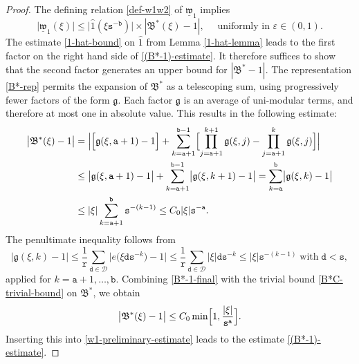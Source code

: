 \documentclass[12pt, twoside]{article}
\theoremstyle{definition}
\numberwithin{equation}{section}
\begin{document}
\begin{proof} 
The defining relation \eqref{def-w1w2} of $\underline{\mathfrak w}_1$ implies 
\begin{equation} \label{w1-preliminary-estimate}
\bigl| \underline{\mathfrak w}_1(\xi)\bigr| \leq  \bigl| \widehat{1}(\xi \mathtt s^{-\mathtt b}) \bigr| \times |\mathfrak B^{\ast}(\xi) - 1|, \quad \text{ uniformly in } \varepsilon\in(0,1). 
\end{equation} 
The estimate \eqref{1-hat-bound} on $\widehat{1}$ from Lemma \ref{1-hat-lemma} leads to the first factor on the right hand side of \eqref{(B*-1)-estimate}. It therefore suffices to show that the second factor generates an upper bound for $|\mathfrak B^{\ast} -1|$.
\vskip0.1in 
\noindent The representation \eqref{B*-rep} permits the expansion of $\mathfrak B^{\ast}$ as a telescoping sum, using progressively fewer factors of the form $\mathfrak g$. Each factor $\mathfrak g$ is an average of uni-modular terms, and therefore at most one in absolute value. This results in the following estimate: 
\begin{align} 
\bigl|\mathfrak B^{\ast}(\xi) - 1 \bigr|  &= \Bigl| \Bigl[\mathfrak g(\xi, \mathtt a+1) - 1\Bigr] + \sum_{k = \mathtt a+1}^{\mathtt b -1} \Bigl[ \prod_{j=\mathtt a+1}^{k+1} \mathfrak g(\xi, j) - \prod_{j=\mathtt a+1}^{k} \mathfrak g(\xi, j) \Bigr] \Bigr| \nonumber \\  
&\leq  \bigl|\mathfrak g(\xi, \mathtt a+1) - 1\bigr| +   \sum_{k = \mathtt a+1}^{\mathtt b -1} \bigl|\mathfrak g(\xi, k+1) - 1\bigr| = \sum_{k=\mathtt a}^{\mathtt b} \bigl| \mathfrak g(\xi, k) -1 \bigr| \nonumber \\
&\leq |\xi| \sum_{k = \mathtt a+1}^{\mathtt b} \mathtt s^{-(k-1)} \leq C_0 |\xi| \mathtt s^{-\mathtt a}. \label{B*-1-final}
\end{align}  
The penultimate inequality follows from 
\[ \bigl|\mathfrak g(\xi, k) - 1 \bigr| \leq \frac{1}{\mathtt r} \sum_{\mathtt d \in \mathscr{D}} \bigl| e \bigl(\xi \mathtt d \mathtt s^{-k} \bigr) - 1\bigr| \leq \frac{1}{\mathtt r} \sum_{\mathtt d \in \mathscr{D}} |\xi| \mathtt d \mathtt s^{-k} \leq |\xi| \mathtt s^{-(k-1)}\;  \text{with}\; \mathtt d < \mathtt s,\]
applied for $k = \mathtt a+1, \ldots, \mathtt b$. Combining \eqref{B*-1-final} with the trivial bound \eqref{B*C-trivial-bound} on $\mathfrak B^{\ast}$, we obtain
\[ \bigl| \mathfrak B^{\ast}(\xi) -1 \bigr| \leq C_0 \min \Bigl[1, \frac{|\xi|}{\mathtt s^{\mathtt a}} \Bigr]. \] 
Inserting this into \eqref{w1-preliminary-estimate} leads to the estimate \eqref{(B*-1)-estimate}. 
 \end{proof}  
\end{document}
